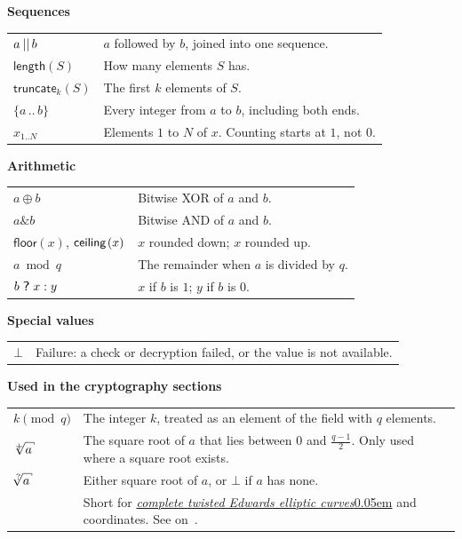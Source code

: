 \documentclass{article}
\makeatletter
\newcommand{\nh}[1]{\nohyphens{#1}}
\newcommand{\readas}[2]{\BeginAccSupp{method=pdfstringdef,ActualText=\text{#1}}{#2}\EndAccSupp{}}
\newcommand{\present}[1]{\BeginAccSupp{ActualText=}{#1}\EndAccSupp{}}
\newcommand{\overlap}[2]{\rlap{#2}\present{\hspace{#1}{#2}}}
\newcommand{\fakebold}[1]{\overlap{0.02em}{\overlap{0.01em}{\spaced{#1}}}}
\newcommand{\schoolbook}[1]{{\fontencoding{T1}\fontfamily{pnc}\selectfont{#1}}}
\newcommand{\schoolbookitalic}[1]{\scalebox{1.02}[0.999]{\schoolbook{#1}}}
\renewcommand{\emph}[1]{\hspace{0.12em}{\schoolbookitalic{\renewcommand{\mathsansvartype}{\mathsansitalictype}\renewcommand{\strongvartype}{\strongitalictype}\textit{#1}}}\hspace{0.12em}}
\newcommand{\slantbox}[2][0.21]{\mbox{\sbox{\argumentbox}{#2}\hskip\wd\argumentbox\pdfsave\pdfsetmatrix{1 0 #1 1}\llap{\usebox{\argumentbox}}\pdfrestore}}
\newcommand{\mathsansitalictype}[1]{\kern-0.08em\slantbox{$\mathsf{#1}$}\kern 0.06em}
\newcommand{\linkstrut}{\rule[-0.4ex]{0ex}{\fontcharht\font`X}}
\newcommand{\refprefix}{\readas{section}{\linkstrut\S\!\!}}
\newcommand{\page}{\readas{page}{p.}\,}
\newcommand{\crossref}[1]{\raisebox{0ex}{\refprefix\autoref{#1}}\hspace{0.25em}\emph{`\nameref*{#1}\kern -0.05em'} on \page\pageref*{#1}}
\newcommand{\introlist}{\needspace{15ex}}
\theoremstyle{labelledtheorem} %
\def\hksqrt{\mathpalette\DHLhksqrt}
\def\DHLhksqrt#1#2{%
\setbox0=\hbox{$#1\sqrt{#2\,}$}\dimen0=\ht0
\advance\dimen0-0.2\ht0
\setbox2=\hbox{\vrule height\ht0 depth -\dimen0}%
{\box0\lower0.4pt\box2}}
\newcommand{\possqrt}[1]{\,{}^+\hspace{-0.7em}\hksqrt{#1\vphantom{b}}}
\newcommand{\optsqrt}[1]{\,{}^?\hspace{-0.7em}\hksqrt{#1\vphantom{b}}}
\newcommand{\strongtype}{\textbf}
\newcommand{\strongitalictype}[1]{\fakebold{\textit{#1}}}
\newcommand{\strongvartype}{\strongtype}
\newcommand{\indextype}{normalstyle}
\newcommand{\defining}[1]{{\renewcommand{\indextype}{definingstyle}#1}}
\newcommand{\mathsanstype}[1]{\ensuremath{\mathsf{#1}}}
\newcommand{\mathsansvartype}{\mathsanstype}
\newcommand{\indexlink}[3]{\texorpdfstring{\hypersetup{pdfborderstyle=/W 0}\hyperlink{index:#2}{#1}%
\hypersetup{pdfborderstyle={/S/U/W 0.7}}\index{#2@{\protect\hypertarget{index:#2}{}\linkstrut\smash{#3}}|\indextype}}{}\xspace}
\newcommand{\rawterm}[1]{\textsl{\nh{#1}}\kern 0.05em}
\newcommand{\termandindex}[2]{\indexlink{\rawterm{#1}}{#2}{#2}}  %
\newcommand{\term}[1]{\termandindex{#1}{#1}}
\newcommand{\terms}[1]{\termandindex{#1s}{#1}}
\newcommand{\completeTwistedEdwardsEllipticCurves}{\terms{complete twisted Edwards elliptic curve}}
\newcommand{\xCtEdwards}{\term{ctEdwards}}
\newcommand{\bconcat}{\mathop{\kern 0.05em||}}
\newcommand{\length}{\mathsf{length}}
\newcommand{\truncate}[1]{\mathsf{truncate}_{#1}}
\newcommand{\setof}[1]{\{{#1}\}}
\newcommand{\barerange}[2]{{{#1}\,..\,{#2}}}
\newcommand{\range}[2]{\setof{\barerange{#1}{#2}}}
\newcommand{\floor}[1]{\mathsf{floor}\!\left({#1}\right)}
\newcommand{\ceiling}[1]{\mathsf{ceiling}\kern-0.06em\left({#1}\right)}
\newcommand{\xor}{\oplus}
\newcommand{\band}{\binampersand}
\newcommand{\bchoose}{\;\scalebox{1.2}[1]{\textsf{?}}\;}
\makeatother
\begin{document}
\introlist
\vspace{1ex}
\noindent\textbf{Sequences}\\[0.5ex]
\begin{tabularx}{\textwidth}{@{}l@{\hskip 1em}X@{}}
  $a \bconcat b$ & $a$ followed by $b$, joined into one sequence. \\
  $\length(S)$ & How many elements $S$ has. \\
  $\truncate{k}(S)$ & The first $k$ elements of $S$. \\
  $\range{a}{b}$ & Every integer from $a$ to $b$, including both ends. \\
  $x_{1..N}$ & Elements $1$ to $N$ of $x$. Counting starts at $1$, not $0$.
\end{tabularx}

\introlist
\vspace{1ex}
\noindent\textbf{Arithmetic}\\[0.5ex]
\begin{tabularx}{\textwidth}{@{}l@{\hskip 1em}X@{}}
  $a \xor b$ & Bitwise XOR of $a$ and $b$. \\
  $a \band b$ & Bitwise AND of $a$ and $b$. \\
  $\floor{x}$, $\ceiling{x}$ & $x$ rounded down; $x$ rounded up. \\
  $a \bmod q$ & The remainder when $a$ is divided by $q$. \\
  $b \bchoose x : y$ & $x$ if $b$ is $1$; $y$ if $b$ is $0$.
\end{tabularx}

\introlist
\vspace{1ex}
\noindent\textbf{Special values}\\[0.5ex]
\begin{tabularx}{\textwidth}{@{}l@{\hskip 1em}X@{}}
  $\bot$ & Failure: a check or decryption failed, or the value is not available.
\end{tabularx}

\introlist
\vspace{1ex}
\noindent\textbf{Used in the cryptography sections}\\[0.5ex]
\begin{tabularx}{\textwidth}{@{}l@{\hskip 1em}X@{}}
  $k \pmod{q}$ & The integer $k$, treated as an element of the field with $q$ elements. \\
  $\possqrt{a}$ & The square root of $a$ that lies between $0$ and $\frac{q-1}{2}$.
                  Only used where a square root exists. \\
  $\optsqrt{a}$ & Either square root of $a$, or $\bot$ if $a$ has none. \\
  \defining{\xCtEdwards} & Short for \completeTwistedEdwardsEllipticCurves and coordinates.
                  See \crossref{jubjub}.
\end{tabularx}
\end{document}
